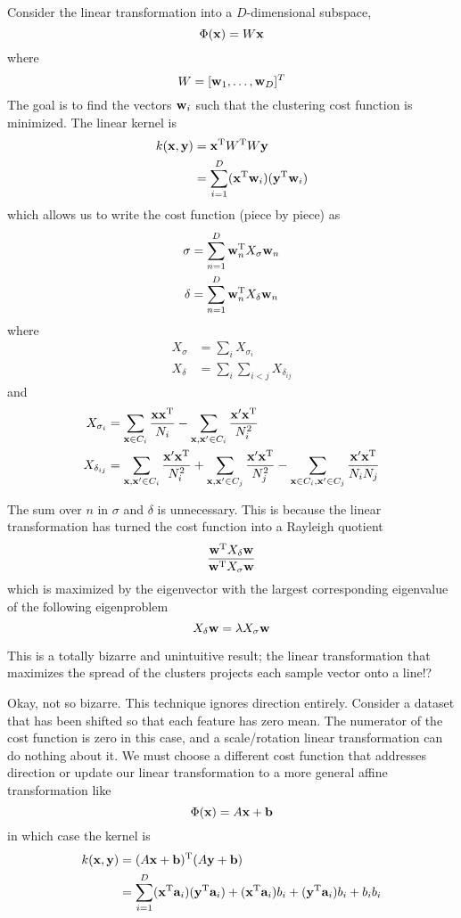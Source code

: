 \documentclass{article}
\newcommand{\bx}{{\bf x}}
\newcommand{\by}{{\bf y}}
\newcommand{\bw}{{\bf w}}
\newcommand{\bb}{{\bf b}}
\newcommand{\ba}{{\bf a}}
\newcommand{\bxp}{\bx^{\prime}}
\begin{document}
Consider the linear transformation into a
$D$-dimensional subspace,
\[
\Phi(\bx) = W \bx
\]
where
\[
W = [\bw_1, \ldots, \bw_D]^T
\]
The goal is to find the vectors $\bw_i$ such that the clustering
cost function is minimized.
The linear kernel is
\begin{align*}
k(\bx, \by)
  &= \bx^{\rm T} W^{\rm T} W \by \\
  &= \sum_{i=1}^D (\bx^{\rm T} \bw_i) (\by^{\rm T} \bw_i)
\end{align*}
which allows us to write the cost function (piece by piece) as
\begin{align*}
\sigma &= \sum_{n=1}^D \bw_n^{\rm T} X_{\sigma} \bw_n \\
\delta &= \sum_{n=1}^D \bw_n^{\rm T} X_{\delta} \bw_n
\end{align*}
where
\begin{align*}
X_{\sigma} &= \sum_i X_{\sigma_i} \\
X_{\delta} &= \sum_i \sum_{i<j} X_{\delta_{ij}}
\end{align*}
and
\begin{align*}
X_{\sigma_i} &=
  \sum_{\bx \in C_i} \frac{\bx \bx^{\rm T}}{N_i} -
  \sum_{\bx, \bxp \in C_i} \frac{\bxp \bx^{\rm T}}{N_i^2} \\
X_{\delta_{ij}} &=
  \sum_{\bx, \bxp \in C_i} \frac{\bxp \bx^{\rm T}}{N_i^2} +
  \sum_{\bx, \bxp \in C_j} \frac{\bxp \bx^{\rm T}}{N_j^2} -
  \sum_{\bx \in C_i, \bxp \in C_j} \frac{\bxp \bx^{\rm T}}{N_i N_j}
\end{align*}

The sum over $n$ in $\sigma$ and $\delta$ is unnecessary. This is
because the linear transformation has turned the cost function into
a Rayleigh quotient
\[
\frac{\bw^{\rm T} X_{\delta} \bw}{\bw^{\rm T} X_{\sigma} \bw}
\]
which is maximized by the eigenvector with the largest corresponding
eigenvalue of the following eigenproblem
\[
X_{\delta} \bw = \lambda X_{\sigma} \bw
\]

This is a totally bizarre and unintuitive result; the linear
transformation that maximizes the spread of the clusters projects each
sample vector onto a line!?

Okay, not so bizarre. This technique ignores direction entirely.
Consider a dataset that has been shifted so that each feature has zero
mean. The numerator of the cost function is zero in this case, and a
scale/rotation linear transformation can do nothing about it. We must
choose a different cost function that addresses direction or update
our linear transformation to a more general affine transformation
like
\[
\Phi(\bx) = A \bx + \bb
\]
in which case the kernel is
\begin{align*}
k(\bx, \by)
  &= (A \bx + \bb)^{\rm T}(A \by + \bb) \\
  &=  \sum_{i=1}^D
        (\bx^{\rm T} \ba_i)(\by^{\rm T} \ba_i) +
        (\bx^{\rm T} \ba_i) b_i +
        (\by^{\rm T} \ba_i) b_i +
        b_i b_i
\end{align*}
\end{document}
